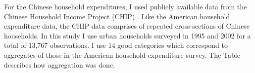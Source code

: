 \documentclass[12pt]{article}
\begin{document}
For the Chinese household expenditures, I used publicly available data from the Chinese Household Income Project (CHIP) \citep{CHIP2002}. Like the American household expenditure data, the CHIP data comprises of repeated cross-sections of Chinese households.  In this study I use urban households surveyed in 1995 and 2002 for a total of 13,767 observations.  I use 14 good categories which correspond to aggregates of those in the American household expenditure survey.   The Table describes how aggregation was done.  
\end{document}

